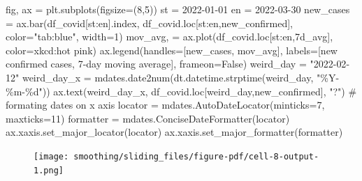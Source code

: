 \documentclass[
  letterpaper,
  DIV=11,
  numbers=noendperiod,
  oneside]{scrreprt}
\newenvironment{Shaded}{\begin{snugshade}}{\end{snugshade}}
\newcommand{\CommentTok}[1]{\textcolor[rgb]{0.37,0.37,0.37}{#1}}
\newcommand{\DecValTok}[1]{\textcolor[rgb]{0.68,0.00,0.00}{#1}}
\newcommand{\NormalTok}[1]{\textcolor[rgb]{0.00,0.23,0.31}{#1}}
\newcommand{\OperatorTok}[1]{\textcolor[rgb]{0.37,0.37,0.37}{#1}}
\newcommand{\SpecialCharTok}[1]{\textcolor[rgb]{0.37,0.37,0.37}{#1}}
\newcommand{\StringTok}[1]{\textcolor[rgb]{0.13,0.47,0.30}{#1}}
\newcommand{\VariableTok}[1]{\textcolor[rgb]{0.07,0.07,0.07}{#1}}
\begin{document}
\begin{Shaded}
\begin{Highlighting}[]
\NormalTok{fig, ax }\OperatorTok{=}\NormalTok{ plt.subplots(figsize}\OperatorTok{=}\NormalTok{(}\DecValTok{8}\NormalTok{,}\DecValTok{5}\NormalTok{))}
\NormalTok{st }\OperatorTok{=} \StringTok{\textquotesingle{}2022{-}01{-}01\textquotesingle{}}
\NormalTok{en }\OperatorTok{=} \StringTok{\textquotesingle{}2022{-}03{-}30\textquotesingle{}}
\NormalTok{new\_cases }\OperatorTok{=}\NormalTok{ ax.bar(df\_covid[st:en].index, df\_covid.loc[st:en,}\StringTok{\textquotesingle{}new\_confirmed\textquotesingle{}}\NormalTok{],}
\NormalTok{       color}\OperatorTok{=}\StringTok{"tab:blue"}\NormalTok{, width}\OperatorTok{=}\DecValTok{1}\NormalTok{)}
\NormalTok{mov\_avg, }\OperatorTok{=}\NormalTok{ ax.plot(df\_covid.loc[st:en,}\StringTok{\textquotesingle{}7d\_avg\textquotesingle{}}\NormalTok{],}
\NormalTok{        color}\OperatorTok{=}\StringTok{\textquotesingle{}xkcd:hot pink\textquotesingle{}}\NormalTok{)}
\NormalTok{ax.legend(handles}\OperatorTok{=}\NormalTok{[new\_cases, mov\_avg],}
\NormalTok{          labels}\OperatorTok{=}\NormalTok{[}\StringTok{\textquotesingle{}new confirmed cases\textquotesingle{}}\NormalTok{, }\StringTok{\textquotesingle{}7{-}day moving average\textquotesingle{}}\NormalTok{],}
\NormalTok{          frameon}\OperatorTok{=}\VariableTok{False}\NormalTok{)}
\NormalTok{weird\_day }\OperatorTok{=} \StringTok{"2022{-}02{-}12"}
\NormalTok{weird\_day\_x }\OperatorTok{=}\NormalTok{ mdates.date2num(dt.datetime.strptime(weird\_day, }\StringTok{"\%Y{-}\%m{-}}\SpecialCharTok{\%d}\StringTok{"}\NormalTok{))}
\NormalTok{ax.text(weird\_day\_x, df\_covid.loc[weird\_day,}\StringTok{\textquotesingle{}new\_confirmed\textquotesingle{}}\NormalTok{], }\StringTok{"?"}\NormalTok{)}
\CommentTok{\# formating dates on x axis}
\NormalTok{locator }\OperatorTok{=}\NormalTok{ mdates.AutoDateLocator(minticks}\OperatorTok{=}\DecValTok{7}\NormalTok{, maxticks}\OperatorTok{=}\DecValTok{11}\NormalTok{)}
\NormalTok{formatter }\OperatorTok{=}\NormalTok{ mdates.ConciseDateFormatter(locator)}
\NormalTok{ax.xaxis.set\_major\_locator(locator)}
\NormalTok{ax.xaxis.set\_major\_formatter(formatter)}
\end{Highlighting}
\end{Shaded}

\begin{figure}[H]

{\centering \texttt{[image: smoothing/sliding\_files/figure-pdf/cell-8-output-1.png]}

}

\end{figure}
\end{document}
